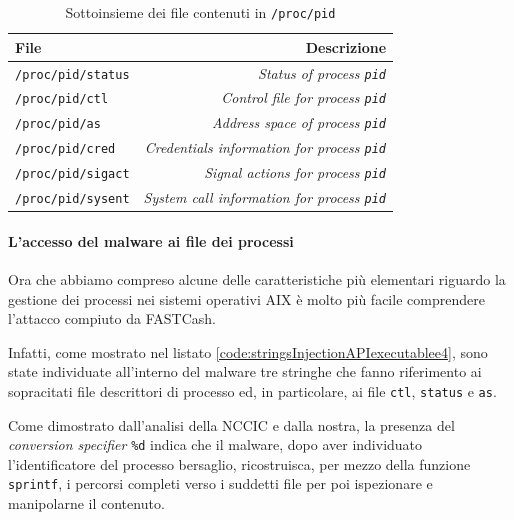 \documentclass[10pt,a4paper, titlepage]{report}
\begin{document}
\begin{table}[h!]
 
    \caption{Sottoinsieme dei file contenuti in \texttt{/proc/pid} }
    \centering
    \label{tab:AIXProcessFiles}
    
    \begin{tabular}{l|r}
      \toprule
      File & Descrizione \\
      \midrule
      \texttt{/proc/pid/status} & \textit{Status of process \texttt{pid}} \\
      \hline
      \texttt{/proc/pid/ctl} & \textit{Control file for process \texttt{pid}} \\
       \hline
      \texttt{/proc/pid/as} & \textit{Address space of process \texttt{pid}} \\
       \hline
      \texttt{/proc/pid/cred} & \textit{Credentials information for process \texttt{pid}} \\
       \hline
      \texttt{/proc/pid/sigact} &\textit{Signal actions for process \texttt{pid}} \\
       \hline
      \texttt{/proc/pid/sysent} & \textit{System call information for process \texttt{pid}}\\
       
      \bottomrule
    \end{tabular}
\end{table}

\paragraph{L'accesso del malware ai file dei processi}

Ora che abbiamo compreso alcune delle caratteristiche più elementari riguardo la gestione dei processi nei sistemi operativi AIX è molto più facile comprendere l'attacco compiuto da FASTCash.

Infatti, come mostrato nel listato \ref{code:stringsInjectionAPIexecutablee4}, sono state individuate all'interno del malware tre stringhe che fanno riferimento ai sopracitati file descrittori di processo ed, in particolare, ai file \texttt{ctl}, \texttt{status} e \texttt{as}.

Come dimostrato dall'analisi della NCCIC e dalla nostra, la presenza del \textit{conversion specifier} \texttt{\%d} indica che il malware, dopo aver individuato l'identificatore del processo bersaglio, ricostruisca, per mezzo della funzione \texttt{sprintf}, i percorsi completi verso i suddetti file per poi ispezionare e manipolarne il contenuto. 
\end{document}
